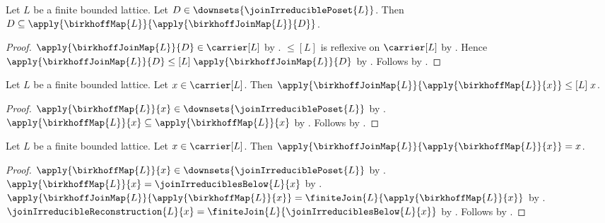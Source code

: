 \begin{proposition}\label{birkhoff_unit_subseteq}
    Let $L$ be a finite bounded lattice.
    Let $D\in\downsets{\joinIrreduciblePoset{L}}$.
    Then $D\subseteq
        \apply{\birkhoffMap{L}}{\apply{\birkhoffJoinMap{L}}{D}}$.
\end{proposition}
\begin{proof}
    $\apply{\birkhoffJoinMap{L}}{D}\in\carrier[L]$ by
        .
    $\leq[L]$ is reflexive on $\carrier[L]$ by
        .
    Hence $\apply{\birkhoffJoinMap{L}}{D}
        \mathrel{\leq[L]}\apply{\birkhoffJoinMap{L}}{D}$ by
        .
    Follows by .
\end{proof}

\begin{proposition}\label{birkhoff_counit_leq}
    Let $L$ be a finite bounded lattice.
    Let $x\in\carrier[L]$.
    Then $\apply{\birkhoffJoinMap{L}}{\apply{\birkhoffMap{L}}{x}}
        \mathrel{\leq[L]}x$.
\end{proposition}
\begin{proof}
    $\apply{\birkhoffMap{L}}{x}\in
        \downsets{\joinIrreduciblePoset{L}}$ by
        .
    $\apply{\birkhoffMap{L}}{x}
        \subseteq\apply{\birkhoffMap{L}}{x}$ by
        .
    Follows by .
\end{proof}

\begin{theorem}\label{birkhoff_join_after_map}
    Let $L$ be a finite bounded lattice.
    Let $x\in\carrier[L]$.
    Then $\apply{\birkhoffJoinMap{L}}{\apply{\birkhoffMap{L}}{x}}=x$.
\end{theorem}
\begin{proof}
    $\apply{\birkhoffMap{L}}{x}\in
        \downsets{\joinIrreduciblePoset{L}}$ by
        .
    $\apply{\birkhoffMap{L}}{x}=\joinIrreduciblesBelow{L}{x}$ by
        .
    $\apply{\birkhoffJoinMap{L}}{\apply{\birkhoffMap{L}}{x}}
        =\finiteJoin{L}{\apply{\birkhoffMap{L}}{x}}$ by
        .
    $\joinIrreducibleReconstruction{L}{x}
        =\finiteJoin{L}{\joinIrreduciblesBelow{L}{x}}$ by
        .
    Follows by .
\end{proof}

